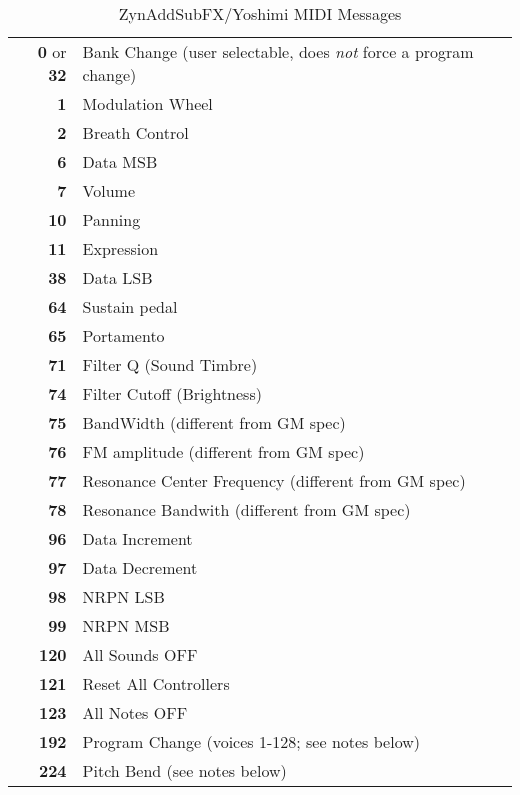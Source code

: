    \begin{table}
      \centering
      \caption{ZynAddSubFX/Yoshimi MIDI Messages}
      \label{table:zynaddsubfx_midi_messages}
      \begin{tabular}{r l}
         \textbf{0} or \textbf{32} &
            Bank Change (user selectable, does \textsl{not} force a program
            change) \\
         \textbf{1} & Modulation Wheel \\
         \textbf{2} & Breath Control \\
         \textbf{6} & Data MSB \\
         \textbf{7} & Volume \\
         \textbf{10} & Panning \\
         \textbf{11} & Expression \\
         \textbf{38} & Data LSB \\
         \textbf{64} & Sustain pedal \\
         \textbf{65} & Portamento \\
         \textbf{71} & Filter Q (Sound Timbre) \\
         \textbf{74} & Filter Cutoff (Brightness) \\
         \textbf{75} & BandWidth (different from GM spec) \\
         \textbf{76} & FM amplitude (different from GM spec) \\
         \textbf{77} & Resonance Center Frequency (different from GM spec) \\
         \textbf{78} & Resonance Bandwith (different from GM spec) \\
         \textbf{96} & Data Increment \\
         \textbf{97} & Data Decrement \\
         \textbf{98} & NRPN LSB \\
         \textbf{99} & NRPN MSB \\
         \textbf{120} & All Sounds OFF \\
         \textbf{121} & Reset All Controllers \\
         \textbf{123} & All Notes OFF \\
         \textbf{192} & Program Change (voices 1-128; see notes below) \\
         \textbf{224} & Pitch Bend (see notes below) \\
      \end{tabular}
   \end{table}

